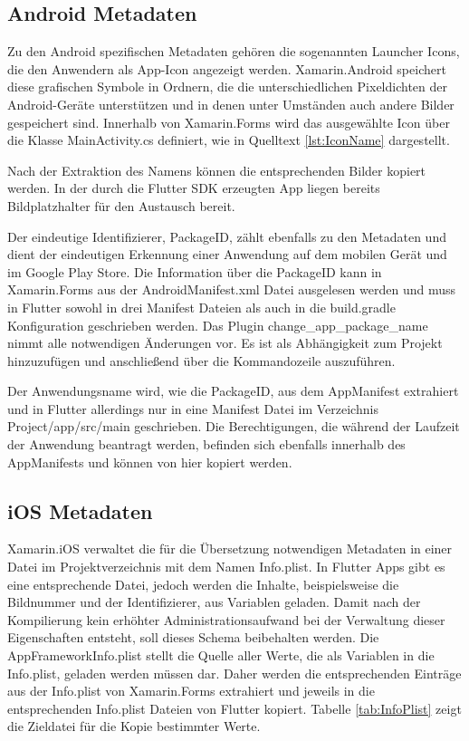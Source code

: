 \subsection{Android Metadaten}
Zu den Android spezifischen Metadaten gehören die sogenannten Launcher Icons, die den Anwendern als App-Icon angezeigt werden. Xamarin.Android speichert diese grafischen Symbole in Ordnern, die die unterschiedlichen Pixeldichten der Android-Geräte unterstützen und in denen unter Umständen auch andere Bilder gespeichert sind.  Innerhalb von Xamarin.Forms wird das ausgewählte Icon über die Klasse  \glq MainActivity.cs\grq{}  definiert, wie in Quelltext \ref{lst:IconName} dargestellt. 



Nach der Extraktion des Namens können die entsprechenden Bilder kopiert werden.  In der durch die Flutter SDK erzeugten App liegen bereits Bildplatzhalter für den Austausch bereit.

Der eindeutige Identifizierer,  PackageID,  zählt ebenfalls zu den Metadaten und dient der eindeutigen Erkennung einer Anwendung auf dem mobilen Gerät und im Google Play Store.  Die Information über die PackageID kann in Xamarin.Forms aus der \glq AndroidManifest.xml\grq{} Datei ausgelesen werden und muss in Flutter sowohl in drei Manifest Dateien als auch in die \glq build.gradle\grq{} Konfiguration geschrieben werden.  Das Plugin \glq change\_app\_package\_name\grq{}  nimmt alle notwendigen Änderungen vor.  Es ist als Abhängigkeit zum Projekt hinzuzufügen und anschließend über die Kommandozeile auszuführen. 

Der Anwendungsname wird, wie die PackageID,  aus dem AppManifest extrahiert und in Flutter allerdings nur in eine Manifest Datei im Verzeichnis \glq Project/app/src/main\grq{} geschrieben.  Die Berechtigungen,  die während der Laufzeit der Anwendung beantragt werden,  befinden sich ebenfalls innerhalb des AppManifests und können von hier kopiert werden.

\subsection{iOS Metadaten}
Xamarin.iOS verwaltet die für die Übersetzung notwendigen Metadaten in einer Datei im  Projektverzeichnis mit dem Namen \glq Info.plist\grq .  In Flutter Apps gibt es eine entsprechende Datei,  jedoch werden die Inhalte,  beispielsweise die Bildnummer und der Identifizierer,  aus Variablen geladen.  Damit nach der Kompilierung kein erhöhter Administrationsaufwand bei der Verwaltung dieser Eigenschaften entsteht,  soll dieses Schema beibehalten werden.  Die \glq AppFrameworkInfo.plist\grq{} stellt die Quelle aller Werte,  die als Variablen in die \glq Info.plist\grq, geladen werden müssen dar.   Daher werden die entsprechenden Einträge aus der \glq Info.plist\grq{} von Xamarin.Forms extrahiert und jeweils in die entsprechenden \glq Info.plist\grq{} Dateien von Flutter kopiert.  Tabelle \ref{tab:InfoPlist} zeigt die Zieldatei für die Kopie bestimmter Werte.

